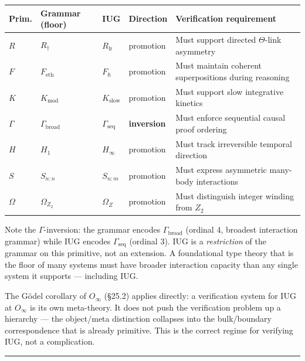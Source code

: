 \documentclass[10pt,a4paper]{article}
\newcommand{\pilcrow}{\S}
\begin{document}
\begin{table}[htbp]
\centering
\small
{}
\begin{tabularx}{\textwidth}{>{\centering\arraybackslash}X >{\centering\arraybackslash}X >{\centering\arraybackslash}X >{\centering\arraybackslash}X >{\centering\arraybackslash}X}
\toprule
\rowcolor{gray!25}\textbf{Prim.} & \textbf{Grammar (floor)} & \textbf{IUG} & \textbf{Direction} & \textbf{Verification requirement} \\
\midrule
\rowcolors{1}{white}{gray!10}
$R$ & $R_{\dagger}$ & $R_\text{lr}$ & promotion & Must support directed $\Theta$-link asymmetry \\
$F$ & $F_\text{eth}$ & $F_{\hbar}$ & promotion & Must maintain coherent superpositions during reasoning \\
$K$ & $K_\text{mod}$ & $K_\text{slow}$ & promotion & Must support slow integrative kinetics \\
$\Gamma$ & $\Gamma_\text{broad}$ & $\Gamma_\text{seq}$ & \textbf{inversion} & Must enforce sequential causal proof ordering \\
$H$ & $H_1$ & $H_{\infty}$ & promotion & Must track irreversible temporal direction \\
$S$ & $S_{n:n}$ & $S_{n:m}$ & promotion & Must express asymmetric many-body interactions \\
$\Omega$ & $\Omega_{Z_2}$ & $\Omega_Z$ & promotion & Must distinguish integer winding from $Z_2$ \\
\bottomrule
\end{tabularx}
\end{table}

Note the $\Gamma$-inversion: the grammar encodes $\Gamma_\text{broad}$ (ordinal 4, broadest
interaction grammar) while IUG encodes $\Gamma_\text{seq}$ (ordinal 3).
IUG is a \emph{restriction} of the grammar on this primitive, not an extension.
A foundational type theory that is the floor of many systems must have broader interaction
capacity than any single system it supports --- including IUG.

The Gödel corollary of $O_{\infty}$ (\pilcrow{}25.2) applies directly: a verification system for IUG
at $O_{\infty}$ is its own meta-theory. It does not push the verification problem up a
hierarchy --- the object/meta distinction collapses into the bulk/boundary correspondence that
is already primitive. This is the correct regime for verifying IUG, not a complication.

\begin{center}
\rule{0.5\textwidth}{0.4pt}
\end{center}
\end{document}
